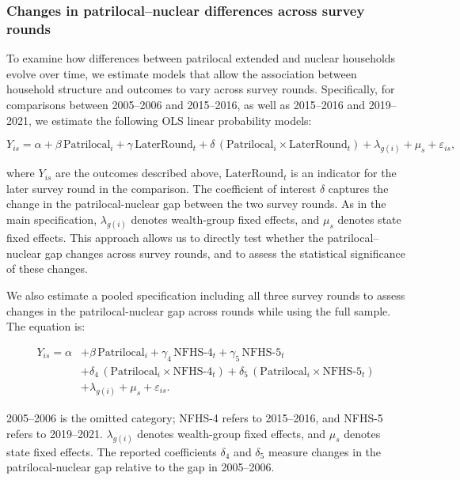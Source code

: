 \documentclass[10pt,twoside,reqno]{article}
\begin{document}
\subsubsection*{Changes in patrilocal–nuclear differences across survey rounds}

To examine how differences between patrilocal extended and nuclear households evolve over time, we estimate models that allow the association between household structure and outcomes to vary across survey rounds. Specifically, for comparisons between 2005--2006 and 2015--2016, as well as 2015--2016 and 2019--2021, we estimate the following OLS linear probability models:

\begin{equation} \label{eq:tworounds}
Y_{is} = \alpha + \beta \,\text{Patrilocal}_i + \gamma \,\text{LaterRound}_t
+ \delta \,(\text{Patrilocal}_i \times \text{LaterRound}_t)
+ \lambda_{g(i)} + \mu_s + \varepsilon_{is},
\end{equation}


where $Y_{is}$ are the outcomes described above, $\text{LaterRound}_t$ is an indicator for the later survey round in the comparison. The coefficient of interest $\delta$ captures the change in the patrilocal-nuclear gap between the two survey rounds. As in the main specification, $\lambda_{g(i)}$ denotes wealth-group fixed effects, and $\mu_s$ denotes state fixed effects. This approach allows us to directly test whether the patrilocal–nuclear gap changes across survey rounds, and to assess the statistical significance of these changes.

We also estimate a pooled specification including all three survey rounds to assess changes in the patrilocal-nuclear gap across rounds while using the full sample. The equation is:

\begin{equation} \label{eq:stacked}
\begin{aligned}
Y_{is} = \alpha 
&+ \beta \,\text{Patrilocal}_i
+ \gamma_4 \,\text{NFHS-4}_t
+ \gamma_5 \,\text{NFHS-5}_t \\
&+ \delta_4 \,(\text{Patrilocal}_i \times \text{NFHS-4}_t)
+ \delta_5 \,(\text{Patrilocal}_i \times \text{NFHS-5}_t) \\
&+ \lambda_{g(i)} + \mu_s + \varepsilon_{is}.
\end{aligned}
\end{equation}

2005--2006 is the omitted category; NFHS-4 refers to 2015--2016, and NFHS-5 refers to 2019--2021. $\lambda_{g(i)}$ denotes wealth-group fixed effects, and $\mu_s$ denotes state fixed effects. The reported coefficients $\delta_4$ and $\delta_5$ measure changes in the patrilocal-nuclear gap relative to the gap in 2005--2006.
\end{document}
